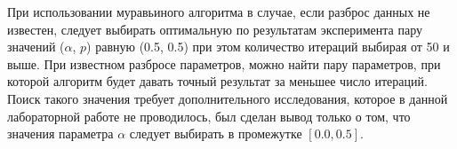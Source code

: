 При использовании муравьиного алгоритма в случае, если разброс данных не
известен, следует выбирать оптимальную по результатам эксперимента пару
значений ($\alpha$, $p$) равную (0.5, 0.5) при этом количество итераций выбирая
от 50 и выше. При известном разбросе параметров, можно найти пару параметров,
при которой алгоритм будет давать точный результат за меньшее число итераций.
Поиск такого значения требует дополнительного исследования, которое в данной
лабораторной работе не проводилось, был сделан вывод только о том, что
значения параметра $\alpha$ следует выбирать в промежутке $[0.0,0.5]$.
